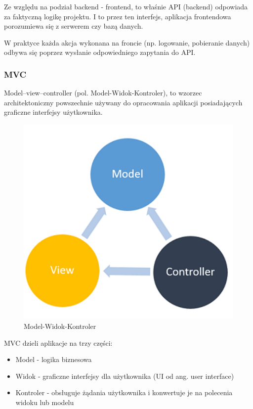 \documentclass[12pt]{article}
\numberwithin{figure}{section}
\begin{document}
\begin{sloppypar}
Ze względu na podział backend - frontend, to właśnie API (backend) odpowiada za faktyczną logikę projektu. I to przez ten interfejs, aplikacja frontendowa porozumiewa się z serwerem czy bazą danych. 
    
W praktyce każda akcja wykonana na froncie (np. logowanie, pobieranie danych) odbywa się poprzez wysłanie odpowiedniego zapytania do API. 
    
\subsubsection{MVC}
Model–view–controller (pol. Model-Widok-Kontroler), to wzorzec architektoniczny powszechnie używany do opracowania aplikacji posiadających graficzne interfejsy użytkownika. 

\begin{figure}[H] 
    \centering
    \includegraphics[width=.75\textwidth]{images/chapter_3/mvc.png}
    \caption{ Model-Widok-Kontroler \cite{mvc}}
    \label{fig:mvc}
\end{figure}
    
MVC dzieli aplikacje na trzy części:
\begin{itemize}
    \item Model - logika biznesowa
    \item Widok - graficzne interfejsy dla użytkownika (UI od ang. user interface) 
    \item Kontroler - obsługuje żądania użytkownika i konwertuje je na polecenia widoku lub modelu
\end{itemize}
    

\end{sloppypar}
\end{document}
